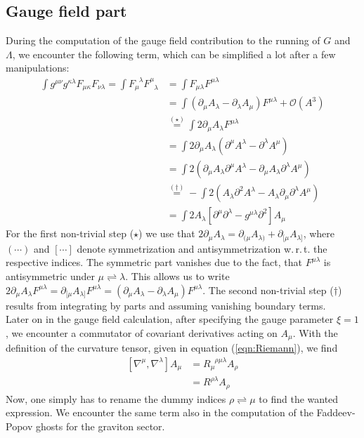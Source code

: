 \subsection*{Gauge field part}
During the computation of the gauge field contribution to the running of $G$ and $\Lambda$, we encounter the following term, which can be simplified a lot after a few manipulations:
\begin{align}\label{eqn:FF2} 
\int g^{\mu\nu}g^{\kappa\lambda} F_{\mu\kappa}F_{\nu\lambda} = \int F_{\mu}^{\phantom{\mu}\lambda}F_{\phantom{\mu}\lambda}^{\mu}	&= \int  F_{\mu\lambda}F^{\mu\lambda} \nonumber	\\
&= \int \left(\partial_{\mu}A_{\lambda} - \partial_{\lambda}A_{\mu}\right)F^{\mu\lambda} + \mathcal{O}\left(A^3\right)\nonumber \\
&\overset{(\star)}{=} \int 2\partial_{\mu}A_{\lambda} F^{\mu\lambda}\nonumber  \\
&=  \int 2\partial_{\mu}A_{\lambda}\left(\partial^{\mu}A^{\lambda} - \partial^{\lambda}A^{\mu}\right) \\
&= \int 2\left(\partial_{\mu}A_{\lambda}\partial^{\mu}A^{\lambda} - \partial_{\mu}A_{\lambda}\partial^{\lambda}A^{\mu}\right) \nonumber\\
&\overset{(\dagger)}{=} -\int 2\left( A_{\lambda}\partial^2A^{\lambda} - A_{\lambda}\partial_{\mu}\partial^{\lambda}A^{\mu}\right) \nonumber\\
&= \int 2A_{\lambda}\left[\partial^{\mu}\partial^{\lambda} - g^{\mu\lambda}\partial^2\right]A_{\mu}\nonumber 
\end{align}
For the first non-trivial step ($\star$) we use that $2\partial_{\mu}A_{\lambda} = \partial_{(\mu}A_{\lambda)} + \partial_{[\mu}A_{\lambda]}$, where $(\cdots)$ and $[\cdots]$ denote symmetrization and antisymmetrization w.\,r.\,t. the respective indices. The symmetric part vanishes due to the fact, that $F^{\mu\lambda}$ is antisymmetric under $\mu \rightleftharpoons \lambda$. This allows us to write $2\partial_{\mu}A_{\lambda}F^{\mu\lambda} = \partial_{[\mu}A_{\lambda]}F^{\mu\lambda} = \left(\partial_{\mu}A_{\lambda} - \partial_{\lambda}A_{\mu}\right)F^{\mu\lambda}$. The  second non-trivial step ($\dagger$) results from integrating by parts and assuming vanishing boundary terms. \\

Later on in the gauge field calculation, after specifying the gauge parameter $\xi=1$, we encounter a commutator of covariant derivatives acting on $A_{\mu}$. With the definition of the curvature tensor, given in equation (\ref{eqn:Riemann}), we find
\begin{equation}
\begin{aligned}
\left[\nabla^{\mu}, \nabla^{\lambda}\right]A_{\mu} &= R_{\mu}^{\phantom{\mu}\rho\mu\lambda}A_{\rho} \\
&= R^{\rho\lambda}A_{\rho} \label{eqn:RiemannB}
\end{aligned}	
\end{equation}
Now, one simply has to rename the dummy indices $\rho \rightleftharpoons \mu$ to find the wanted expression. We encounter the same term also in the computation of the Faddeev-Popov ghosts for the graviton sector.  	